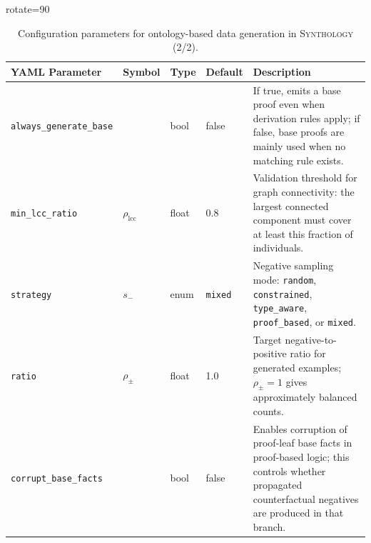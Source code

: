 \documentclass{IOS-Book-Article}     %
\begin{document}
\begin{table}[h!]
	\centering
	\begin{adjustbox}{rotate=90}
		\begin{tabular}{|l|l|l|l|p{9.76cm}|}
			\hline
			\textbf{YAML Parameter}         & \textbf{Symbol}     & \textbf{Type} & \textbf{Default} & \textbf{Description}                                                                                                                                     \\
			\hline
			\hline
			\texttt{always\_generate\_base} &                     & bool          & false            & If true, emits a base proof even when derivation rules apply; if false, base proofs are mainly used when no matching rule exists.                        \\
			\hline
			\texttt{min\_lcc\_ratio}        & $\rho_{\text{lcc}}$ & float         & 0.8              & Validation threshold for graph connectivity: the largest connected component must cover at least this fraction of individuals.                           \\
			\hline

			\texttt{strategy}               & $s_{-}$             & enum          & \texttt{mixed}   & Negative sampling mode: \texttt{random}, \texttt{constrained}, \texttt{type\_aware}, \texttt{proof\_based}, or \texttt{mixed}.                           \\
			\hline
			\texttt{ratio}                  & $\rho_{\pm}$        & float         & 1.0              & Target negative-to-positive ratio for generated examples; $\rho_{\pm}=1$ gives approximately balanced counts.                                            \\
			\hline
			\texttt{corrupt\_base\_facts}   &                     & bool          & false            & Enables corruption of proof-leaf base facts in proof-based logic; this controls whether propagated counterfactual negatives are produced in that branch. \\
			\hline
		\end{tabular}
	\end{adjustbox}
	\caption{Configuration parameters for ontology-based data generation in \textsc{Synthology} (2/2).}
	\label{tab:synthology-config}
\end{table}



\newpage





\end{document}

